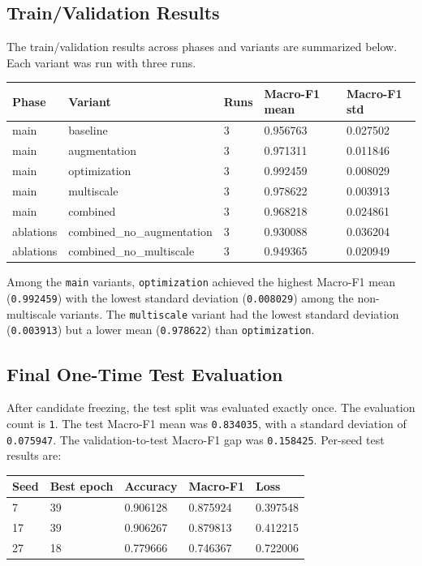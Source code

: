 \documentclass[10pt]{article}
\begin{document}
\subsection{Train/Validation Results}
The train/validation results across phases and variants are summarized below. Each variant was run with three runs.
\begin{longtable}{p{}p{}p{}p{}p{}}
\toprule
Phase & Variant & Runs & Macro-F1 mean & Macro-F1 std \\
\midrule \endhead
main & baseline & 3 & 0.956763 & 0.027502 \\
main & augmentation & 3 & 0.971311 & 0.011846 \\
main & optimization & 3 & 0.992459 & 0.008029 \\
main & multiscale & 3 & 0.978622 & 0.003913 \\
main & combined & 3 & 0.968218 & 0.024861 \\
ablations & combined\_no\_augmentation & 3 & 0.930088 & 0.036204 \\
ablations & combined\_no\_multiscale & 3 & 0.949365 & 0.020949 \\
\bottomrule\end{longtable}
Among the \texttt{main} variants, \texttt{optimization} achieved the highest Macro-F1 mean (\texttt{0.992459}) with the lowest standard deviation (\texttt{0.008029}) among the non-multiscale variants. The \texttt{multiscale} variant had the lowest standard deviation (\texttt{0.003913}) but a lower mean (\texttt{0.978622}) than \texttt{optimization}.
\subsection{Final One-Time Test Evaluation}
After candidate freezing, the test split was evaluated exactly once. The evaluation count is \texttt{1}. The test Macro-F1 mean was \texttt{0.834035}, with a standard deviation of \texttt{0.075947}. The validation-to-test Macro-F1 gap was \texttt{0.158425}.
Per-seed test results are:
\begin{longtable}{p{}p{}p{}p{}p{}}
\toprule
Seed & Best epoch & Accuracy & Macro-F1 & Loss \\
\midrule \endhead
7 & 39 & 0.906128 & 0.875924 & 0.397548 \\
17 & 39 & 0.906267 & 0.879813 & 0.412215 \\
27 & 18 & 0.779666 & 0.746367 & 0.722006 \\
\bottomrule\end{longtable}
\end{document}
